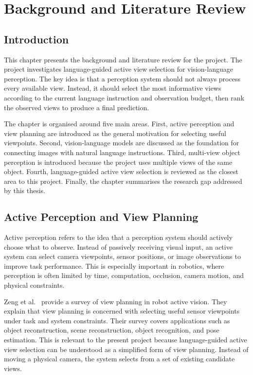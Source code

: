\chapter{Background and Literature Review}
\label{chap:background}

\section{Introduction}

This chapter presents the background and literature review for the project. The project investigates language-guided active view selection for vision-language perception. The key idea is that a perception system should not always process every available view. Instead, it should select the most informative views according to the current language instruction and observation budget, then rank the observed views to produce a final prediction.

The chapter is organised around five main areas. First, active perception and view planning are introduced as the general motivation for selecting useful viewpoints. Second, vision-language models are discussed as the foundation for connecting images with natural language instructions. Third, multi-view object perception is introduced because the project uses multiple views of the same object. Fourth, language-guided active view selection is reviewed as the closest area to this project. Finally, the chapter summarises the research gap addressed by this thesis.

\section{Active Perception and View Planning}

Active perception refers to the idea that a perception system should actively choose what to observe. Instead of passively receiving visual input, an active system can select camera viewpoints, sensor positions, or image observations to improve task performance. This is especially important in robotics, where perception is often limited by time, computation, occlusion, camera motion, and physical constraints.

Zeng et al.~\cite{zeng_view_2020} provide a survey of view planning in robot active vision. They explain that view planning is concerned with selecting useful sensor viewpoints under task and system constraints. Their survey covers applications such as object reconstruction, scene reconstruction, object recognition, and pose estimation. This is relevant to the present project because language-guided active view selection can be understood as a simplified form of view planning. Instead of moving a physical camera, the system selects from a set of existing candidate views.

